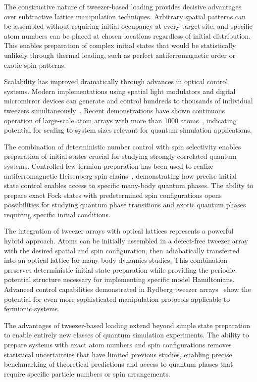 The constructive nature of tweezer-based loading provides decisive advantages over subtractive lattice manipulation techniques. Arbitrary spatial patterns can be assembled without requiring initial occupancy at every target site, and specific atom numbers can be placed at chosen locations regardless of initial distribution. This enables preparation of complex initial states that would be statistically unlikely through thermal loading, such as perfect antiferromagnetic order or exotic spin patterns.

Scalability has improved dramatically through advances in optical control systems. Modern implementations using spatial light modulators and digital micromirror devices can generate and control hundreds to thousands of individual tweezers simultaneously~\cite{stuart_single-atom_2018}. Recent demonstrations have shown continuous operation of large-scale atom arrays with more than 1000 atoms~\cite{gyger_continuous_2024}, indicating potential for scaling to system sizes relevant for quantum simulation applications.

The combination of deterministic number control with spin selectivity enables preparation of initial states crucial for studying strongly correlated quantum systems. Controlled few-fermion preparation has been used to realize antiferromagnetic Heisenberg spin chains~\cite{murmann_antiferromagnetic_2015}, demonstrating how precise initial state control enables access to specific many-body quantum phases. The ability to prepare exact Fock states with predetermined spin configurations opens possibilities for studying quantum phase transitions and exotic quantum phases requiring specific initial conditions.

The integration of tweezer arrays with optical lattices represents a powerful hybrid approach. Atoms can be initially assembled in a defect-free tweezer array with the desired spatial and spin configuration, then adiabatically transferred into an optical lattice for many-body dynamics studies. This combination preserves deterministic initial state preparation while providing the periodic potential structure necessary for implementing specific model Hamiltonians. Advanced control capabilities demonstrated in Rydberg tweezer arrays~\cite{bornet_enhancing_2024} show the potential for even more sophisticated manipulation protocols applicable to fermionic systems.

The advantages of tweezer-based loading extend beyond simple state preparation to enable entirely new classes of quantum simulation experiments. The ability to prepare systems with exact atom numbers and spin configurations removes statistical uncertainties that have limited previous studies, enabling precise benchmarking of theoretical predictions and access to quantum phases that require specific particle numbers or spin arrangements.